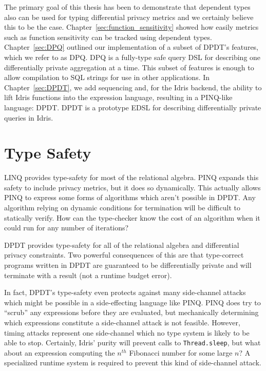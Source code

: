 \documentclass[12pt]{report}
\begin{document}
The primary goal of this thesis has been to demonstrate that dependent types also can be used for typing differential privacy metrics and we certainly believe this to be the case.
Chapter~\ref{sec:function_sensitivity} showed how easily metrics such as function sensitivity can be tracked using dependent types.
Chapter~\ref{sec:DPQ} outlined our implementation of a subset of DPDT's features, which we refer to as DPQ.
DPQ is a fully-type safe query DSL for describing one differentially private aggregation at a time.
This subset of features is enough to allow compilation to SQL strings for use in other applications.
In Chapter~\ref{sec:DPDT}, we add sequencing and, for the Idris backend, the ability to lift Idris functions into the expression language, resulting in a PINQ-like language: DPDT.
DPDT is a prototype EDSL for describing differentially private queries in Idris.

\section{Type Safety}

LINQ provides type-safety for most of the relational algebra.
PINQ expands this safety to include privacy metrics, but it does so dynamically.
This actually allows PINQ to express some forms of algorithms which aren't possible in DPDT.
Any algorithm relying on dynamic conditions for termination will be difficult to statically verify.
How can the type-checker know the cost of an algorithm when it could run for any number of iterations?

DPDT provides type-safety for all of the relational algebra and differential privacy constraints.
Two powerful consequences of this are that type-correct programs written in DPDT are guaranteed to be differentially private and will terminate with a result (not a runtime budget error).

In fact, DPDT's type-safety even protects against many side-channel attacks which might be possible in a side-effecting language like PINQ.
PINQ does try to ``scrub'' any expressions before they are evaluated, but mechanically determining which expressions constitute a side-channel attack is not feasible.
However, timing attacks represent one side-channel which no type system is likely to be able to stop.
Certainly, Idris' purity will prevent calls to \texttt{Thread.sleep}, but what about an expression computing the $n^{th}$ Fibonacci number for some large $n$?
A specialized runtime system is required to prevent this kind of side-channel attack\cite{conf/uss/HaeberlenPN11}.
\end{document}
